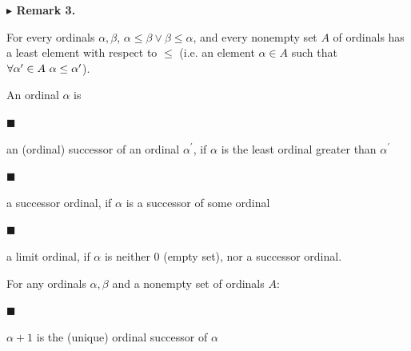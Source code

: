  
 
\par\medskip\noindent\textbf{$\blacktriangleright$ Remark 3.}\par
 
 
For every ordinals $\alpha,\beta$, $\alpha\leq\beta\vee\beta\leq\alpha$, and every nonempty set $A$ of ordinals has a least element with respect to $\leq$ (i.e. an element $\alpha\in A$ such that $\forall\alpha^{\prime}\in A\leavevmode\nobreak\ \alpha\leq\alpha^{\prime}$).\par
 
 
 
 
An ordinal $\alpha$ is\par
  
\par\noindent  $\blacksquare$ 
 
an (ordinal) successor of an ordinal $\alpha^{\prime}$, if $\alpha$ is the least ordinal greater than $\alpha^{\prime}$\par
 
 
 
\par\noindent  $\blacksquare$ 
 
a successor ordinal, if $\alpha$ is a successor of some ordinal\par
 
 
 
\par\noindent  $\blacksquare$ 
 
a limit ordinal, if $\alpha$ is neither 0 (empty set), nor a successor ordinal.\par
 
 
  
 
 
For any ordinals $\alpha,\beta$ and a nonempty set of ordinals $A$:\par
  
\par\noindent  $\blacksquare$ 
 
$\alpha+1$ is the (unique) ordinal successor of $\alpha$\par
 
